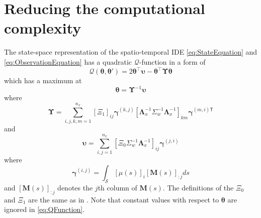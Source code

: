 \documentclass[11pt,draftcls,onecolumn,peerreview]{IEEEtran}
\begin{document}
{{\section*{Reducing the computational complexity}
The state-space representation of the spatio-temporal IDE \eqref{eq:StateEquation} and \eqref{eq:ObservationEquation} has a quadratic $\mathcal Q$-function in a form of \cite{Dewar2009}
\begin{equation}
\mathcal{Q}\left(\boldsymbol\theta,\boldsymbol\theta'\right)=2 \boldsymbol\theta^\top\boldsymbol\upsilon -\boldsymbol\theta^\top\boldsymbol\Upsilon\boldsymbol\theta
\label{eq:QFunction}
\end{equation}
which has a maximum at
\begin{equation}
 \boldsymbol\theta=\boldsymbol\Upsilon^{-1}\boldsymbol\upsilon
\end{equation}
where
\begin{equation}
 \boldsymbol\Upsilon=\sum_{i,j,k,m=1}^{n_x}\left[ \Xi_1\right] _{ij}\boldsymbol\gamma^{\left(k,j\right)}\left[\boldsymbol\Lambda_{x}^{-1}\Sigma_{w}^{-1} \boldsymbol\Lambda_{x}^{-1}\right]_{km} \boldsymbol\gamma^{\left(m,i\right)\mathsf{T}}
\end{equation}
and
\begin{equation}
 \boldsymbol \upsilon=\sum_{i,j=1}^{n_x}\left[\Xi_0\Sigma_{w}^{-1}\boldsymbol\Lambda_{x}^{-1} \right]_{ij}\boldsymbol\gamma^{\left(j,i\right)} 
\end{equation}
where
\begin{equation}
 \boldsymbol\gamma^{(i,j)}=\int_{\mathcal S}\left[ \mu(s)\right]_i\left[ \mathbf M(s)\right] _{:j}ds
\end{equation}
and $\left[ \mathbf M(s)\right] _{:j}$ denotes the $j$th column of $\mathbf M(s)$. The definitions of the $\Xi_0$ and $\Xi_1$ are the same as in \cite{Dewar2009}. Note that constant values with respect to $\boldsymbol \theta$ are ignored in \eqref{eq:QFunction}.








}}
\end{document}
